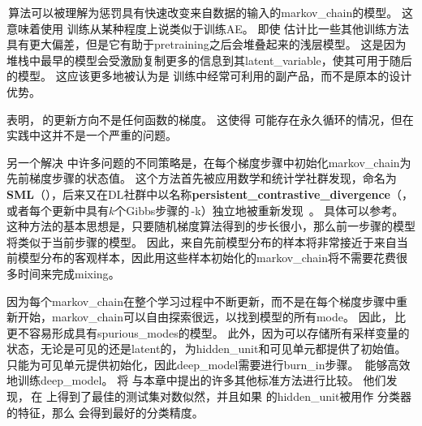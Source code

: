 
\,算法可以被理解为惩罚具有快速改变来自数据的输入的\gls{markov_chain}的模型。%
这意味着使用\,\,训练从某种程度上说类似于训练\gls{AE}。
即使\,\,估计比一些其他训练方法具有更大偏差，但是它有助于\gls{pretraining}之后会堆叠起来的浅层模型。
这是因为堆栈中最早的模型会受激励复制更多的信息到其\gls{latent_variable}，使其可用于随后的模型。
这应该更多地被认为是\,\,训练中经常可利用的副产品，而不是原本的设计优势。%


\cite{sutskever2010convergence-small}表明，\,的更新方向不是任何函数的梯度。
这使得\,\,可能存在永久循环的情况，但在实践中这并不是一个严重的问题。


另一个解决\,\,中许多问题的不同策略是，在每个梯度步骤中初始化\gls{markov_chain}为先前梯度步骤的状态值。
这个方法首先被应用数学和统计学社群发现，命名为\textbf{\gls{SML}}（）\citep{Younes98onthe}，后来又在\gls{DL}社群中以名称\textbf{\gls{persistent_contrastive_divergence}}（，或者每个更新中具有$k$个Gibbs步骤的\,-k）独立地被重新发现~\citep{Tieleman08-small}。
具体可以参考。
这种方法的基本思想是，只要随机梯度算法得到的步长很小，那么前一步骤的模型将类似于当前步骤的模型。
因此，来自先前模型分布的样本将非常接近于来自当前模型分布的客观样本，因此用这些样本初始化的\gls{markov_chain}将不需要花费很多时间来完成\gls{mixing}。%


因为每个\gls{markov_chain}在整个学习过程中不断更新，而不是在每个梯度步骤中重新开始，\gls{markov_chain}可以自由探索很远，以找到模型的所有\gls{mode}。 
因此，\,比\,\,更不容易形成具有\gls{spurious_modes}的模型。
此外，因为可以存储所有采样变量的状态，无论是可见的还是\gls{latent}的，\,为\gls{hidden_unit}和可见单元都提供了初始值。
\,只能为可见单元提供初始化，因此\gls{deep_model}需要进行\gls{burn_in}步骤。
\,能够高效地训练\gls{deep_model}。
\cite{Marlin10Inductive-small}将\,\,与本章中提出的许多其他标准方法进行比较。
他们发现，\,在\,\,上得到了最佳的测试集对数似然，并且如果\,\,的\gls{hidden_unit}被用作\,\,分类器的特征，那么\,\,会得到最好的分类精度。

